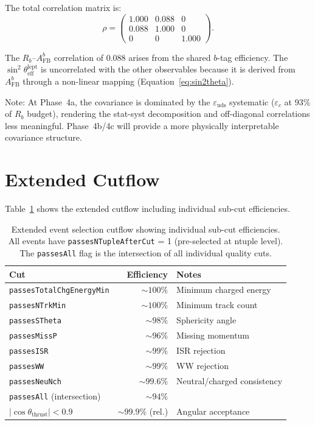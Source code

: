 \documentclass[11pt,a4paper]{article}
\begin{document}
The total correlation matrix is:
\begin{equation}
\rho = \begin{pmatrix}
1.000 & 0.088 & 0 \\
0.088 & 1.000 & 0 \\
0 & 0 & 1.000
\end{pmatrix}.
\label{eq:correlation}
\end{equation}

The $R_b$--$A_\mathrm{FB}^b$ correlation of 0.088 arises from the shared $b$-tag
efficiency. The $\sin^2\theta_\mathrm{eff}^\mathrm{lept}$ is uncorrelated with the
other observables because it is derived from $A_\mathrm{FB}^b$ through a non-linear
mapping (Equation~\ref{eq:sin2theta}).

Note: At Phase~4a, the covariance is dominated by the $\varepsilon_\mathrm{uds}$
systematic ($\varepsilon_c$ at 93\% of $R_b$ budget), rendering the stat-syst decomposition and
off-diagonal correlations less meaningful. Phase~4b/4c will provide a more
physically interpretable covariance structure.

\section{Extended Cutflow}
\label{app:cutflow}

Table~\ref{tab:extended_cutflow} shows the extended cutflow including individual
sub-cut efficiencies.

\begin{table}[htbp]
\centering
\caption{Extended event selection cutflow showing individual sub-cut efficiencies.
All events have \texttt{passesNTupleAfterCut} = 1 (pre-selected at ntuple level).
The \texttt{passesAll} flag is the intersection of all individual quality cuts.}
\label{tab:extended_cutflow}
\begin{tabular}{lrl}
\toprule
Cut & Efficiency & Notes \\
\midrule
\texttt{passesTotalChgEnergyMin} & $\sim 100\%$ & Minimum charged energy \\
\texttt{passesNTrkMin} & $\sim 100\%$ & Minimum track count \\
\texttt{passesSTheta} & $\sim 98\%$ & Sphericity angle \\
\texttt{passesMissP} & $\sim 96\%$ & Missing momentum \\
\texttt{passesISR} & $\sim 99\%$ & ISR rejection \\
\texttt{passesWW} & $\sim 99\%$ & WW rejection \\
\texttt{passesNeuNch} & $\sim 99.6\%$ & Neutral/charged consistency \\
\texttt{passesAll} (intersection) & $\sim 94\%$ & \\
$|\cos\theta_\mathrm{thrust}| < 0.9$ & $\sim 99.9\%$ (rel.) & Angular acceptance \\
\bottomrule
\end{tabular}
\end{table}
\end{document}
